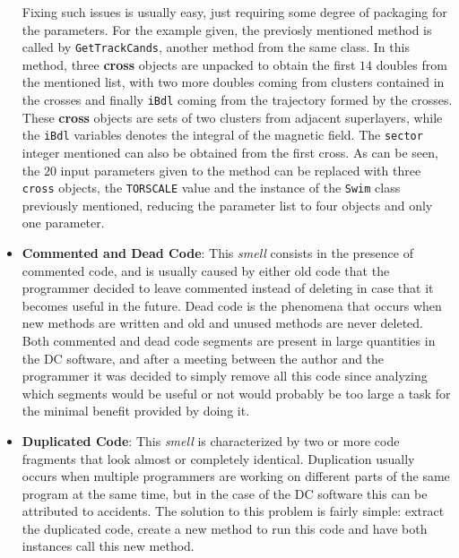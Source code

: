 \begin{itemize}
        Fixing such issues is usually easy, just requiring some degree of packaging for the parameters.
        For the example given, the previosly mentioned method is called by \texttt{GetTrackCands}, another method from the same class.
        In this method, three \textbf{cross} objects are unpacked to obtain the first $14$ doubles from the mentioned list, with two more doubles coming from clusters contained in the crosses and finally \texttt{iBdl} coming from the trajectory formed by the crosses.
        These \textbf{cross} objects are sets of two clusters from adjacent superlayers, while the \texttt{iBdl} variables denotes the integral of the magnetic field. %
        The \texttt{sector} integer mentioned can also be obtained from the first cross.
        As can be seen, the $20$ input parameters given to the method can be replaced with three \texttt{cross} objects, the \texttt{TORSCALE} value and the instance of the \texttt{Swim} class previously mentioned, reducing the parameter list to four objects and only one parameter. %
    
        \item \textbf{Commented and Dead Code}: This \textit{smell} consists in the presence of commented code, and is usually caused by either old code that the programmer decided to leave commented instead of deleting in case that it becomes useful in the future.
        Dead code is the phenomena that occurs when new methods are written and old and unused methods are never deleted.
        Both commented and dead code segments are present in large quantities in the DC software, and after a meeting between the author and the programmer it was decided to simply remove all this code since analyzing which segments would be useful or not would probably be too large a task for the minimal benefit provided by doing it.

        \item \textbf{Duplicated Code}: This \textit{smell} is characterized by two or more code fragments that look almost or completely identical.
        Duplication usually occurs when multiple programmers are working on different parts of the same program at the same time, but in the case of the DC software this can be attributed to accidents. %
        The solution to this problem is fairly simple: extract the duplicated code, create a new method to run this code and have both instances call this new method.
    

\end{itemize}

